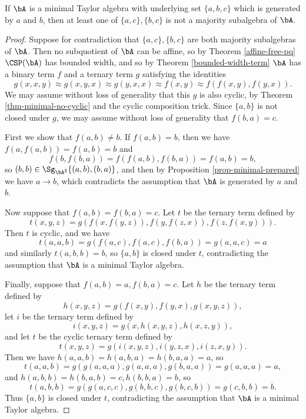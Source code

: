 \begin{prop} If $\bA$ is a minimal Taylor algebra with underlying set $\{a,b,c\}$ which is generated by $a$ and $b$, then at least one of $\{a,c\}, \{b,c\}$ is not a majority subalgebra of $\bA$.
\end{prop}
\begin{proof} Suppose for contradiction that $\{a,c\},\{b,c\}$ are both majority subalgebras of $\bA$. Then no subquotient of $\bA$ can be affine, so by Theorem \ref{affine-free-pq} $\CSP(\bA)$ has bounded width, and so by Theorem \ref{bounded-width-term} $\bA$ has a binary term $f$ and a ternary term $g$ satisfying the identities
\[
g(x,x,y) \approx g(x,y,x) \approx g(y,x,x) \approx f(x,y) \approx f(f(x,y),f(y,x)).
\]
We may assume without loss of generality that this $g$ is also cyclic, by Theorem \ref{thm-minimal-no-cyclic} and the cyclic composition trick. Since $\{a,b\}$ is not closed under $g$, we may assume without loss of generality that $f(b,a) = c$.

First we show that $f(a,b) \ne b$. If $f(a,b) = b$, then we have $f(a,f(a,b)) = f(a,b) = b$ and
\[
f(b,f(b,a)) = f(f(a,b),f(b,a)) = f(a,b) = b,
\]
so $(b,b) \in \Sg_{\bA^2}\{(a,b),(b,a)\}$, and then by Proposition \ref{prop-minimal-prepared} we have $a \rightarrow b$, which contradicts the assumption that $\bA$ is generated by $a$ and $b$.

Now suppose that $f(a,b) = f(b,a) = c$. Let $t$ be the ternary term defined by
\[
t(x,y,z) = g(f(x,f(y,z)),f(y,f(z,x)),f(z,f(x,y))).
\]
Then $t$ is cyclic, and we have
\[
t(a,a,b) = g(f(a,c),f(a,c),f(b,a)) = g(a,a,c) = a
\]
and similarly $t(a,b,b) = b$, so $\{a,b\}$ is closed under $t$, contradicting the assumption that $\bA$ is a minimal Taylor algebra.

Finally, suppose that $f(a,b) = a, f(b,a) = c$. Let $h$ be the ternary term defined by
\[
h(x,y,z) = g(f(x,y),f(y,x),g(x,y,z)),
\]
let $i$ be the ternary term defined by
\[
i(x,y,z) = g(x,h(x,y,z),h(x,z,y)),
\]
and let $t$ be the cyclic ternary term defined by
\[
t(x,y,z) = g(i(x,y,z),i(y,z,x),i(z,x,y)).
\]
Then we have $h(a,a,b) = h(a,b,a) = h(b,a,a) = a$, so
\[
t(a,a,b) = g(g(a,a,a),g(a,a,a),g(b,a,a)) = g(a,a,a) = a,
\]
and $h(a,b,b) = h(b,a,b) = c, h(b,b,a) = b$, so
\[
t(a,b,b) = g(g(a,c,c),g(b,b,c),g(b,c,b)) = g(c,b,b) = b.
\]
Thus $\{a,b\}$ is closed under $t$, contradicting the assumption that $\bA$ is a minimal Taylor algebra.
\end{proof}


